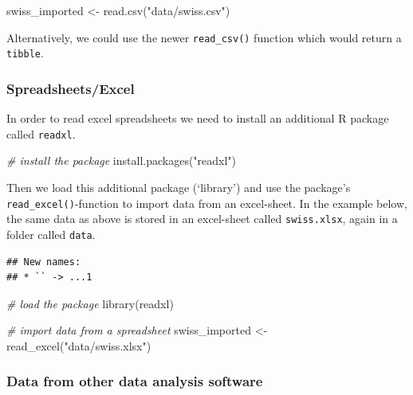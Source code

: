 \documentclass[
  12pt,
]{style/krantz}
\newenvironment{Shaded}{\begin{snugshade}}{\end{snugshade}}
\newcommand{\CommentTok}[1]{\textcolor[rgb]{0.56,0.35,0.01}{\textit{#1}}}
\newcommand{\FunctionTok}[1]{\textcolor[rgb]{0.00,0.00,0.00}{#1}}
\newcommand{\NormalTok}[1]{#1}
\newcommand{\OtherTok}[1]{\textcolor[rgb]{0.56,0.35,0.01}{#1}}
\newcommand{\StringTok}[1]{\textcolor[rgb]{0.31,0.60,0.02}{#1}}
\begin{document}
\begin{Shaded}
\begin{Highlighting}[]
\NormalTok{swiss\_imported }\OtherTok{\textless{}{-}} \FunctionTok{read.csv}\NormalTok{(}\StringTok{"data/swiss.csv"}\NormalTok{)}
\end{Highlighting}
\end{Shaded}

Alternatively, we could use the newer \texttt{read\_csv()} function which would return a \texttt{tibble}.

\hypertarget{spreadsheetsexcel}{%
\subsubsection{Spreadsheets/Excel}\label{spreadsheetsexcel}}

In order to read excel spreadsheets we need to install an additional R package called \texttt{readxl}.

\begin{Shaded}
\begin{Highlighting}[]
\CommentTok{\# install the package }
\FunctionTok{install.packages}\NormalTok{(}\StringTok{"readxl"}\NormalTok{)}
\end{Highlighting}
\end{Shaded}

Then we load this additional package (`library') and use the package's \texttt{read\_excel()}-function to import data from an excel-sheet. In the example below, the same data as above is stored in an excel-sheet called \texttt{swiss.xlsx}, again in a folder called \texttt{data}.

\begin{verbatim}
## New names:
## * `` -> ...1
\end{verbatim}

\begin{Shaded}
\begin{Highlighting}[]
\CommentTok{\# load the package}
\FunctionTok{library}\NormalTok{(readxl)}

\CommentTok{\# import data from a spreadsheet}
\NormalTok{swiss\_imported }\OtherTok{\textless{}{-}} \FunctionTok{read\_excel}\NormalTok{(}\StringTok{"data/swiss.xlsx"}\NormalTok{)}
\end{Highlighting}
\end{Shaded}

\hypertarget{data-from-other-data-analysis-software}{%
\subsubsection{Data from other data analysis software}\label{data-from-other-data-analysis-software}}
\end{document}
